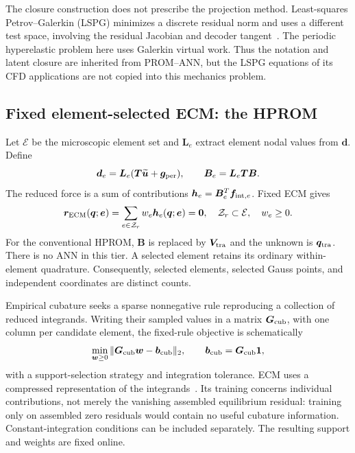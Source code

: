 The closure construction does not prescribe the projection method. Least-squares Petrov--Galerkin (LSPG) minimizes a discrete residual norm and uses a different test space, involving the residual Jacobian and decoder tangent~\cite{Lee2020,Chmiel2024,aresdeparga2026nonlinear}. The periodic hyperelastic problem here uses Galerkin virtual work. Thus the notation and latent closure are inherited from PROM--ANN, but the LSPG equations of its CFD applications are not copied into this mechanics problem.

\subsection{Fixed element-selected ECM: the HPROM}
Let $\mathcal E$ be the microscopic element set and $\bm L_e$ extract element nodal values from $\bm d$. Define
\begin{equation}
 \bm d_e=\bm L_e(\bm T\widetilde{\bm u}+\bm g_{\rm per}),
 \qquad \bm B_e=\bm L_e\bm T\bm B .
\end{equation}
The reduced force is a sum of contributions
$\bm h_e=\bm B_e^T\bm f_{{\rm int},e}$. Fixed ECM gives
\begin{equation}
 \bm r_{\rm ECM}(\bm q;\bm e)=
       \sum_{e\in\mathcal Z_r}w_e\bm h_e(\bm q;\bm e)=\bm0,
 \quad \mathcal Z_r\subset\mathcal E,\quad w_e\geq0.
 \label{eq:ecm}
\end{equation}
For the conventional HPROM, $\bm B$ is replaced by $\bm V_{\rm tra}$ and the unknown is $\bm q_{\rm tra}$. There is no ANN in this tier. A selected element retains its ordinary within-element quadrature. Consequently, selected elements, selected Gauss points, and independent coordinates are distinct counts.

Empirical cubature seeks a sparse nonnegative rule reproducing a collection of reduced integrands. Writing their sampled values in a matrix $\bm G_{\rm cub}$, with one column per candidate element, the fixed-rule objective is schematically
\begin{equation}
 \min_{\bm w\geq0}\|\bm G_{\rm cub}\bm w-\bm b_{\rm cub}\|_2,
 \qquad \bm b_{\rm cub}=\bm G_{\rm cub}\bm1,
 \label{eq:cubature_training}
\end{equation}
with a support-selection strategy and integration tolerance. ECM uses a compressed representation of the integrands~\cite{hernandez2017}. Its training concerns individual contributions, not merely the vanishing assembled equilibrium residual: training only on assembled zero residuals would contain no useful cubature information. Constant-integration conditions can be included separately. The resulting support and weights are fixed online.

